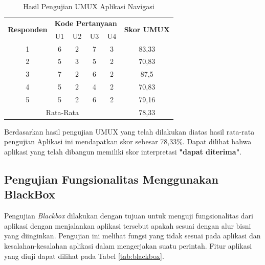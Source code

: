 \begin{table}[H]
\caption{Hasil Pengujian UMUX Aplikasi Navigasi}
\label{tab:skor-umux}
\centering
\begin{tabular}{|ccccc|c|}
\hline
\multicolumn{1}{|c|}{\multirow{2}{*}{\textbf{Responden}}} & \multicolumn{4}{c|}{\textbf{Kode Pertanyaan}} & \multirow{2}{*}{\textbf{Skor UMUX}} \\ \cline{2-5}
\multicolumn{1}{|c|}{}  & \multicolumn{1}{c|}{U1} & \multicolumn{1}{c|}{U2} & \multicolumn{1}{c|}{U3} & U4 &       \\ \hline
\multicolumn{1}{|c|}{1} & \multicolumn{1}{c|}{6}  & \multicolumn{1}{c|}{2}  & \multicolumn{1}{c|}{7}  & 3  & 83,33 \\ \hline
\multicolumn{1}{|c|}{2} & \multicolumn{1}{c|}{5}  & \multicolumn{1}{c|}{3}  & \multicolumn{1}{c|}{5}  & 2  & 70,83 \\ \hline
\multicolumn{1}{|c|}{3} & \multicolumn{1}{c|}{7}  & \multicolumn{1}{c|}{2}  & \multicolumn{1}{c|}{6}  & 2  & 87,5  \\ \hline
\multicolumn{1}{|c|}{4} & \multicolumn{1}{c|}{5}  & \multicolumn{1}{c|}{2}  & \multicolumn{1}{c|}{4}  & 2  & 70,83 \\ \hline
\multicolumn{1}{|c|}{5} & \multicolumn{1}{c|}{5}  & \multicolumn{1}{c|}{2}  & \multicolumn{1}{c|}{6}  & 2  & 79,16 \\ \hline
\multicolumn{5}{|c|}{Rata-Rata}                                                                            & 78,33       \\ \hline
\end{tabular}
\end{table}

\par Berdasarkan hasil pengujian UMUX yang telah dilakukan diatas hasil rata-rata pengujian Aplikasi ini mendapatkan skor sebesar 78,33\%. Dapat dilihat bahwa aplikasi yang telah dibangun memiliki skor interpretasi \textbf{"dapat diterima"}.


\newpage
\subsection{Pengujian Fungsionalitas Menggunakan BlackBox}
\par Pengujian \textit{Blackbox} dilakukan dengan tujuan untuk menguji fungsionalitas dari aplikasi dengan menjalankan aplikasi tersebut apakah sesuai dengan alur bisni yang diinginkan.  Pengujian ini melihat fungsi yang tidak sesuai pada aplikasi dan
kesalahan-kesalahan aplikasi dalam mengerjakan suatu perintah. Fitur aplikasi yang diuji dapat dilihat pada Tabel \ref{tab:blackbox}.

